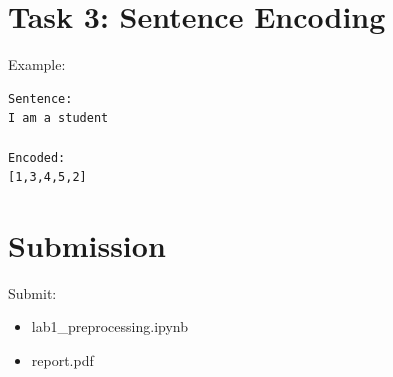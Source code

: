 \documentclass[12pt]{article}
\begin{document}
\section{Task 3: Sentence Encoding}

Example:

\begin{verbatim}
Sentence:
I am a student

Encoded:
[1,3,4,5,2]
\end{verbatim}

\section{Submission}

Submit:
\begin{itemize}
\item lab1\_preprocessing.ipynb
\item report.pdf
\end{itemize}
\end{document}
